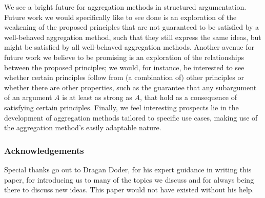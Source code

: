\documentclass[runningheads]{llncs}
\begin{document}
We see a bright future for aggregation methods in structured argumentation. Future work we would specifically like to see done is an exploration of the weakening of the proposed principles that are not guaranteed to be satisfied by a well-behaved aggregation method, such that they still express the same ideas, but might be satisfied by all well-behaved aggregation methods. Another avenue for future work we believe to be promising is an exploration of the relationships between the proposed principles; we would, for instance, be interested to see whether certain principles follow from (a combination of) other principles or whether there are other properties, such as the guarantee that any subargument of an argument $A$ is at least as strong as $A$, that hold as a consequence of satisfying certain principles. Finally, we feel interesting prospects lie in the development of aggregation methods tailored to specific use cases, making use of the aggregation method's easily adaptable nature.
%
\subsubsection*{Acknowledgements}
Special thanks go out to Dragan Doder, for his expert guidance in writing this paper, for introducing us to many of the topics we  discuss and for always being there to discuss new ideas. This paper would not have existed without his help.
%


%
\end{document}
